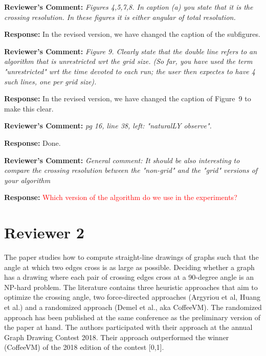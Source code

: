 \documentclass{article}
\newcommand{\rcomment}[1]{\vspace{0.3cm} \item \textbf{Reviewer's Comment:} {\em #1}}
\newcommand{\tcomment}[1]{\vspace{0.3cm} {\color{red} \item \textbf{Reviewer's Comment:} {\em #1}}}
\newcommand{\response}{\vspace{0.2cm} \textbf{Response: }}
\begin{document}
\begin{itemize}
\rcomment{Figures 4,5,7,8. In caption (a) you state that it is the crossing resolution. In these figures it is either angular of total resolution.}

\response{In the revised version, we have changed the caption of the subfigures.}

\rcomment{Figure 9. Clearly state that the double line refers to an algorithm that is unrestricted wrt the grid size. (So far, you have used the term "unrestricted" wrt the time devoted to each run; the user then expectes to have 4 such lines, one per grid size).}

\response{In the revised version, we have changed the caption of Figure~9 to make this clear.}

\rcomment{pg 16, line 38, left: "naturalLY observe".}

\response{Done.}

\tcomment{General comment: It should be also interesting to compare the crossing resolution between the "non-grid" and the "grid" versions of your algorithm}

\response{\textcolor{red}{Which version of the algorithm do we use in the experiments?}}
\end{itemize}


\newpage
\section*{Reviewer 2}

The paper studies how to compute straight-line drawings of graphs such that the angle at which two edges cross is as large as possible. Deciding whether a graph has a drawing where each pair of crossing edges cross at a 90-degree angle is an NP-hard problem. The literature contains three heuristic approaches that aim to optimize the crossing angle, two force-directed approaches (Argyriou et al, Huang et al.) and a randomized approach (Demel et al., aka CoffeeVM). The randomized approach has been published at the same conference as the preliminary version of the paper at hand.  The authors participated with their approach at the annual Graph Drawing Contest 2018. Their approach outperformed the winner (CoffeeVM) of the 2018 edition of the contest [0,1].
\end{document}
